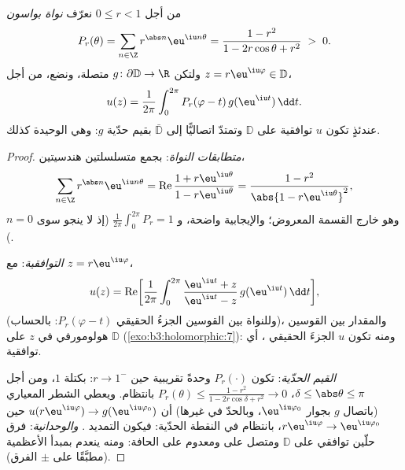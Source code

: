 \begin{theorem}
\label{thm:b3:conformal:poisson}
من أجل $0 \leq r < 1$ نعرّف \emph{نواة بواسون}
\[
P_r(\theta) = \sum_{n\in\Z}r^{\abs n}\eu^{\iu n\theta}
= \frac{1 - r^2}{1 - 2r\cos\theta + r^2} \;>\; 0 .
\]
ولتكن $g \colon \partial\mathbb D \to \R$ متصلة، ونضع، من أجل $z = r\eu^{\iu\varphi} \in \mathbb D$،
\[
u(z) = \frac1{2\pi}\int_0^{2\pi}
P_r(\varphi - t)\,g(\eu^{\iu t})\,\dd t .
\]
عندئذٍ تكون $u$ توافقية على $\mathbb D$ وتمتدّ اتصاليًّا إلى
$\bar{\mathbb D}$ بقيم حدّية $g$: وهي  الوحيدة
كذلك.
\end{theorem}

\begin{proof}
\emph{متطابقات النواة}: بجمع متسلسلتين هندسيتين،
\[
\sum_{n\in\Z}r^{\abs n}\eu^{\iu n\theta}
= \operatorname{Re}\frac{1 + r\eu^{\iu\theta}}{1 -
r\eu^{\iu\theta}}
= \frac{1 - r^2}{\abs{1 - r\eu^{\iu\theta}}^2},
\]
وهو خارج القسمة المعروض؛ والإيجابية واضحة، و $\frac1{2\pi}\int_0^{2\pi}P_r = 1$ (إذ لا
ينجو سوى $n = 0$).

\emph{التوافقية}: مع $z = r\eu^{\iu\varphi}$،
\[
u(z) = \operatorname{Re}\biggl[\frac1{2\pi}\int_0^{2\pi}
\frac{\eu^{\iu t} + z}{\eu^{\iu t} - z}\,
g(\eu^{\iu t})\,\dd t\biggr],
\]
(وللنواة بين القوسين الجزءُ الحقيقي $P_r(\varphi - t)$: بالحساب)،
والمقدار بين القوسين هولومورفي في $z$ على $\mathbb D$
(\cref{exo:b3:holomorphic:7}): ومنه تكون $u$ الجزءَ الحقيقي ،
أي توافقية.

\emph{القيم الحدّية}: تكون $P_r(\cdot)$ وحدةً تقريبية حين
$r \to 1^-$: بكتلة $1$، ومن أجل $\delta \leq
\abs\theta \leq \pi$، $P_r(\theta) \leq \frac{1 - r^2}{1 -
2r\cos\delta + r^2} \to 0$ بانتظام.
ويعطي الشطر المعياري (باتصال $g$ بجوار $\eu^{\iu\varphi_0}$، وبالحدّ في
غيرها) أن $u(r\eu^{\iu\varphi}) \to
g(\eu^{\iu\varphi_0})$ حين $r\eu^{\iu\varphi} \to
\eu^{\iu\varphi_0}$، بانتظام في النقطة الحدّية:
فيكون التمديد . \emph{والوحدانية}: فرق حلّين توافقي على
$\mathbb D$ ومتصل على  ومعدوم على الحافة: ومنه ينعدم
بمبدأ الأعظمية (مطبَّقًا على $\pm$ الفرق).
\end{proof}

